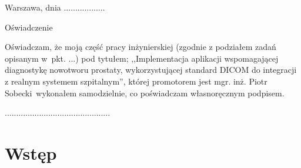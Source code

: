 \documentclass[a4paper,11pt,twoside]{report}
\theoremstyle{definition}
\newcommand{\tytul}{Implementacja aplikacji wspomagającej diagnostykę nowotworu prostaty, wykorzystującej standard DICOM do integracji z realnym systemem szpitalnym}
\newcommand{\type}{inżyniers} %
\newcommand{\supervisor}{mgr. inż. Piotr Sobecki}
\begin{document}
\null \hfill Warszawa, dnia ..................\\

\par\vspace{5cm}

\begin{center}
Oświadczenie %
\end{center}

\indent Oświadczam, że moją część pracy \type kiej (zgodnie z podziałem zadań opisanym w~pkt. ...) pod tytułem; ,,\tytul '', której promotorem jest \supervisor \ wykonałem samodzielnie, co poświadczam własnoręcznym podpisem.
\vspace{2cm}


\begin{flushright}
  \begin{minipage}{50mm}
    \begin{center}
      ..............................................

    \end{center}
  \end{minipage}
\end{flushright}

\thispagestyle{empty}
\newpage

\null\thispagestyle{empty}\newpage

\thispagestyle{empty}
\tableofcontents
\thispagestyle{empty}
\newpage
\setcounter{page}{11}
\pagestyle{fancy}

\chapter{Wstęp} %
\end{document}

